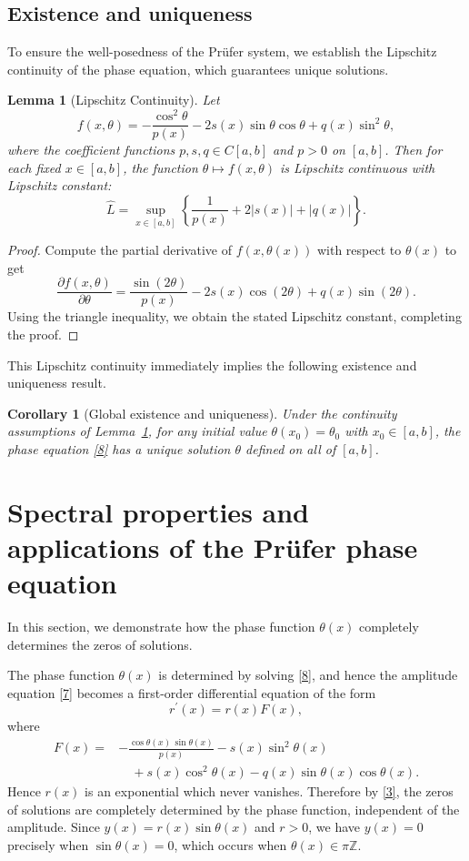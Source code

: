 \documentclass[11pt, reqno]{amsart}
\numberwithin{equation}{section}  %
\theoremstyle{plain}
\newtheorem{lemma}[theorem]{Lemma}
\newtheorem{corollary}[theorem]{Corollary}
\theoremstyle{definition}
\theoremstyle{remark}
\begin{document}
\subsection{Existence and uniqueness}
To ensure the well-posedness of the Pr\"ufer system, we establish the Lipschitz continuity of the phase equation, which guarantees unique solutions.
\begin{lemma}[Lipschitz Continuity]
\label{lem22}
Let 
\[
f(x,\theta)=-\dfrac{\cos^2\theta}{p(x)}-2s(x)\sin\theta\cos\theta+q(x) \sin^2\theta,\]
where the coefficient functions $p, s, q \in C[a,b]$ and $p>0$ on $[a,b]$. Then for each fixed $x \in [a,b]$, the function $\theta \mapsto f(x,\theta)$ is Lipschitz continuous with Lipschitz constant:
\[\hat{L}=\sup_{x \in [a,b]} \left\{ \frac{1}{p(x)} + 2|s(x)| + |q(x)| \right\}.\]
\end{lemma}
\begin{proof}
Compute the partial derivative of $f(x,\theta(x))$ with respect to $\theta(x)$ to get
\[\frac{\partial f(x,\theta)}{\partial \theta} = \frac{\sin (2\theta)}{p(x)} - 2 s(x) \cos(2\theta) + q(x) \sin(2\theta).\]
Using the triangle inequality, we obtain the stated Lipschitz constant, completing the proof.
\end{proof}
\noindent This Lipschitz continuity immediately implies the following existence and uniqueness result.
\begin{corollary}[Global existence and uniqueness]
Under the continuity assumptions of Lemma~\ref{lem22}, for any initial value $\theta(x_0)=\theta_0$ with $x_0 \in [a,b]$, the phase equation \eqref{8} has a unique solution $\theta$ defined on all of $[a,b]$.
\end{corollary}

\section{Spectral properties and applications of the Pr\"ufer phase equation}
\label{sec:spectral}
In this section, we demonstrate how the phase function $\theta(x)$ completely determines the zeros of solutions.

The phase function $\theta(x)$ is determined by solving \eqref{8}, and hence the amplitude equation \eqref{7} becomes a first-order differential equation of the form
\begin{equation*} 
r^\prime(x) = r(x) F(x),
\end{equation*}
where
\[
\begin{aligned}
F(x) ={}&
-\frac{\cos\theta(x)\,\sin\theta(x)}{p(x)}
- s(x)\sin^2\theta(x) \\
&\quad
+ s(x)\cos^2\theta(x)
- q(x)\sin\theta(x)\cos\theta(x).
\end{aligned}
\]
Hence $r(x)$ is an exponential which never vanishes. Therefore by \eqref{3}, the zeros of solutions are completely determined by the phase function, independent of the amplitude. Since $y(x) = r(x)\sin\theta(x)$ and $r > 0$, we have $y(x) = 0$ precisely when $\sin\theta(x) = 0$, which occurs when $\theta(x) \in \pi \mathbb{Z}$.
\end{document}
